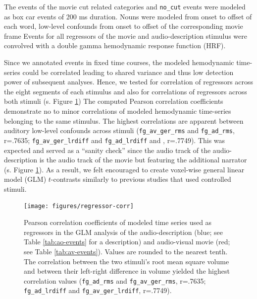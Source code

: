 \documentclass[english]{article}
\begin{document}
The events of the movie cut related categories and \texttt{no\_cut} events were
modeled as box car events of 200 ms duration.
%
Nouns were modeled from onset to offset of each word, low-level confounds from
onset to offset of the corresponding movie frame
Events for all regressors of the movie and audio-description stimulus were convolved with a double
gamma hemodynamic response function (HRF).

Since we annotated events in fixed time courses, the modeled hemodynamic
time-series could be correlated leading to shared variance and thus low
detection power of subsequent analyses.
Hence, we tested for correlation of regressors across the eight segments of each
stimulus and also for correlations of regressors across both stimuli (s. Figure
\ref{fig:reg-corr})
The computed Pearson correlation coefficients demonstrate no to minor
correlations of modeled hemodynamic time-series belonging to the same stimulus.
The highest correlations are apparent between auditory low-level confounds
across stimuli (\texttt{fg\_av\_ger\_rms} and \texttt{fg\_ad\_rms}, r=.7635;
\texttt{fg\_av\_ger\_lrdiff} and \texttt{fg\_ad\_lrdiff} and , r=.7749).
This was expected and served as a ``sanity check'' since the audio track of the
audio-description is the audio track of the movie but featuring the additional
narrator (s. Figure \ref{fig:reg-corr}).
As a result, we felt encouraged to create voxel-wise general linear model (GLM)
$t$-contrasts similarly to previous studies that used controlled stimuli.


\begin{figure}[h!]
\centering
    \texttt{[image: figures/regressor-corr]} \caption{Pearson
        correlation coefficients of modeled time series used as regressors in
        the GLM analysis of the
        audio-description (blue; see Table \ref{tab:ao-events} for a
        description) and audio-visual movie (red; see Table
        \ref{tab:av-events}).
        Values are rounded to the nearest tenth.
        The correlation between the two stimuli's
        root mean square volume and between their left-right difference in
        volume yielded the highest correlation values
        (\texttt{fg\_ad\_rms} and \texttt{fg\_av\_ger\_rms}, r=.7635;
        \texttt{fg\_ad\_lrdiff} and \texttt{fg\_av\_ger\_lrdiff}, r=.7749).
      }
\label{fig:reg-corr}
\end{figure}
\end{document}
